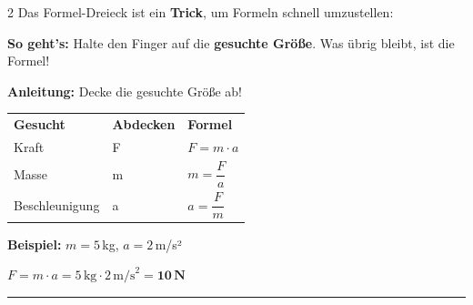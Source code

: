 \documentclass[11pt, a4paper]{article}
\begin{document}
\begin{multicols}{2}
Das Formel-Dreieck ist ein \textbf{Trick}, um Formeln schnell umzustellen:

\vspace{0.2em}
\textbf{So geht's:} Halte den Finger auf die \textbf{gesuchte Größe}. Was übrig bleibt, ist die Formel!

\vspace{0.3em}

\begin{center}
\end{center}

\vspace{0.3em}

\textbf{Anleitung:} Decke die gesuchte Größe ab!

\begin{tabular}{@{}lll@{}}
\textbf{Gesucht} & \textbf{Abdecken} & \textbf{Formel} \\[0.3em]
Kraft & F & $F = m \cdot a$ \\[0.2em]
Masse & m & $m = \dfrac{F}{a}$ \\[0.5em]
Beschleunigung & a & $a = \dfrac{F}{m}$
\end{tabular}

\vspace{0.5em}

\begin{beispielbox}
\textbf{Beispiel:} $m = 5\,$kg, $a = 2\,$m/s²

$F = m \cdot a = 5\,\text{kg} \cdot 2\,\text{m/s}^2 = \mathbf{10\,N}$
\end{beispielbox}

\end{multicols}

\vspace{0.3em}
\hrule
\vspace{0.5em}

\end{document}
